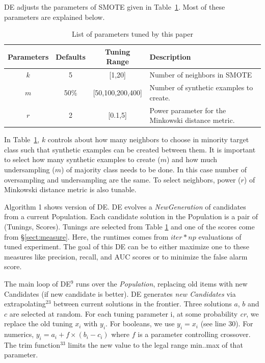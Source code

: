 \documentclass[sigconf,review, anonymous]{acmart}
\theoremstyle{break}
\theoremstyle{break}
\newcommand{\tion}[1]{{\S}\ref{sect:#1}}
\begin{document}
DE  adjusts the parameters of SMOTE given in
Table~\ref{tb:tuned}. Most of these parameters are explained below. 

\begin{table}[!htbp]
    \begin{center}
\scriptsize
\begin{tabular}{|c|c|c|p{3.5cm}|}
        \hline 
        \textbf{Parameters} & \textbf{Defaults} & \textbf{Tuning Range} & \textbf{Description}\\
        \hline
        $k$ & 5 & [1,20] & Number of neighbors in SMOTE \\ 
        \hline
       $m$ & 50\% & [50,100,200,400] & Number of synthetic examples to create. \\ 
        \hline
        $r$ & 2 & [0.1,5] & Power parameter for the Minkowski distance metric.\\

        \hline
\end{tabular}
\end{center}
\caption{List of parameters tuned by this paper}
\label{tb:tuned}
\end{table}
 
In Table~\ref{tb:tuned}, $k$ controls about how many neighbors to choose in minority target class such that synthetic examples can be created between them. It is important to select how many synthetic examples to create ($m$) and how much undersampling ($m$) of majority class needs to be done. In this case number of oversampling and undersampling are the same. To select neighbors, power ($r$) of Minkowski distance metric is also tunable.

Algorithm 1 shows version of DE.  DE evolves a \textit{NewGeneration} of
candidates from a current Population.   Each candidate solution in the Population is a pair of
(Tunings, Scores). Tunings are selected from Table \ref{tb:tuned} and one of the scores
come from \tion{measure}. Here, the runtimes comes from $\mathit{iter} * np $ evaluations of tuned experiment. The goal of this DE can be to either maximize one to these measures like precision, recall, and AUC scores or to minimize the false alarm score.

The main loop of DE$^{9}$ runs over the \textit{Population}, replacing old items with new Candidates (if new candidate is better).
DE generates \textit{new Candidates} via 
extrapolating$^{23}$ between current solutions in the frontier. Three solutions $a$, $b$ and $c$ are
selected at random. For each tuning parameter i, at some probability \textit{cr}, we
replace the old tuning $x_i$ with $y_i$. For booleans, we use $y_i = x_i$ (see
line 30). For numerics, $y_i = a_i + f \times (b_i - c_i)$ where $f$ is a
parameter controlling crossover. The trim function$^{33}$ limits the new value
to the legal range min..max of that parameter.
\end{document}
